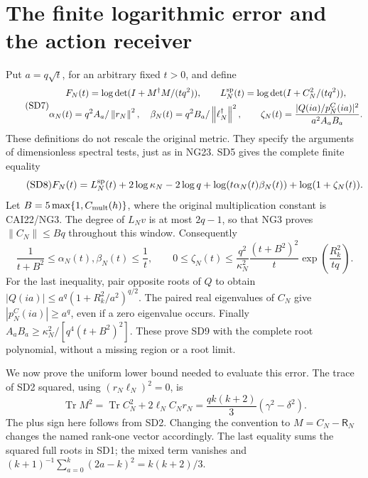 \documentclass[11pt]{article}
\newcommand{\norm}[1]{\left\lVert#1\right\rVert}
\newcommand{\Tr}{\operatorname{Tr}}\newcommand{\rank}{\operatorname{rank}}
\begin{document}
\section{The finite logarithmic error and the action receiver}
Put $a=q\sqrt t$, for an arbitrary fixed $t>0$, and define
\begin{equation}\tag{SD7}
\begin{gathered}
F_N(t)=\log\det(I+M^\dagger M/(tq^2)),\qquad
L_N^{\rm sp}(t)=\log\det(I+C_N^2/(tq^2)),\\
\alpha_N(t)=q^2 A_a/\norm{r_N}^2,\quad
\beta_N(t)=q^2 B_a/\norm{\ell_N^\dagger}^2,\qquad
\zeta_N(t)=\frac{|Q(ia)/p_N^C(ia)|^2}{a^2A_aB_a}.
\end{gathered}
\end{equation}
These definitions do not rescale the original metric. They specify the
arguments of dimensionless spectral tests, just as in NG23.
SD5 gives the complete finite equality
\begin{equation}\tag{SD8}
F_N(t)=L_N^{\rm sp}(t)+2\log\kappa_N-2\log q
+\log(t\alpha_N(t)\beta_N(t))+\log(1+\zeta_N(t)).
\end{equation}
Let $B=5\max\{1,C_{\rm mult}(h)\}$, where the original multiplication
constant is CAI22/NG3. The degree of $L_Nv$ is at most $2q-1$, so that
NG3 proves $\norm{C_N}\le Bq$ throughout this window. Consequently
\begin{equation}\tag{SD9}
\frac1{t+B^2}\le\alpha_N(t),\beta_N(t)\le\frac1t,
\qquad
0\le\zeta_N(t)\le
\frac{q^2}{\kappa_N^2}\frac{(t+B^2)^2}{t}
\exp\!\left(\frac{R_k^2}{tq}\right).
\end{equation}
For the last inequality, pair opposite roots of $Q$ to obtain
$|Q(ia)|\le a^q(1+R_k^2/a^2)^{q/2}$. The paired real eigenvalues of
$C_N$ give $|p_N^C(ia)|\ge a^q$, even if a zero eigenvalue occurs.
Finally $A_aB_a\ge\kappa_N^2/[q^4(t+B^2)^2]$. These prove SD9 with
the complete root polynomial, without a missing region or a root limit.

We now prove the uniform lower bound needed to evaluate this error.
The trace of SD2 squared, using $(r_N\ell_N)^2=0$, is
\begin{equation}\tag{SD10}
\Tr M^2=\Tr C_N^2+2\ell_N C_Nr_N
=\frac{qk(k+2)}3(\gamma^2-\delta^2).
\end{equation}
The plus sign here follows from SD2. Changing the convention to
$M=C_N-\mathsf R_N$ changes the named rank-one vector accordingly.
The last equality sums the squared full roots in SD1; the mixed term
vanishes and $(k+1)^{-1}\sum_{a=0}^k(2a-k)^2=k(k+2)/3$.
\end{document}
